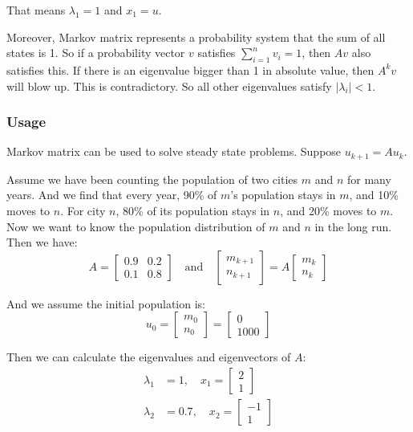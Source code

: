 \documentclass[12pt]{ctexart}
\begin{document}
That means $\lambda_1 = 1$ and $x_1 = u$.

Moreover, Markov matrix represents a probability system that the sum of all states is 1.
So if a probability vector $v$ satisfies $\sum_{i=1}^{n} v_i = 1$, then $Av$ also
satisfies this. If there is an eigenvalue bigger than 1 in absolute value, then $A^k v$
will blow up. This is contradictory. So all other eigenvalues satisfy $|\lambda_i| < 1$.

\subsubsection{\textbf{Usage}}

Markov matrix can be used to solve steady state problems. Suppose $u_{k+1} = Au_k$.

Assume we have been counting the population of two cities $m$ and $n$ for many years.
And we find that every year, 90\% of $m$'s population stays in $m$, and 10\% moves to
$n$. For city $n$, 80\% of its population stays in $n$, and 20\% moves to $m$. Now we
want to know the population distribution of $m$ and $n$ in the long run. Then we have:
\[
  A = \begin{bmatrix}
    0.9 & 0.2 \\
    0.1 & 0.8
  \end{bmatrix}
  \quad \text{and} \quad
  \begin{bmatrix}
    m_{k+1} \\
    n_{k+1}
  \end{bmatrix} =
  A \begin{bmatrix}
    m_k \\
    n_k
  \end{bmatrix}
\]

And we assume the initial population is:
\[
  u_0 = \begin{bmatrix}
    m_0 \\
    n_0
  \end{bmatrix} =
  \begin{bmatrix}
    0 \\
    1000
  \end{bmatrix}
\]

Then we can calculate the eigenvalues and eigenvectors of $A$:
\begin{align*}
  \lambda_1 &= 1, \quad x_1 = \begin{bmatrix} 2 \\ 1 \end{bmatrix} \\
  \lambda_2 &= 0.7, \quad x_2 = \begin{bmatrix} -1 \\ 1 \end{bmatrix}
\end{align*}
\end{document}
